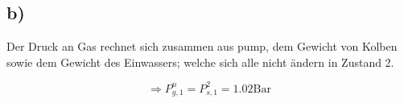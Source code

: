 

\subsection*{b)}
Der Druck an Gas rechnet sich zusammen aus pump, dem Gewicht von Kolben sowie dem Gewicht des Einwassers; welche sich alle nicht ändern in Zustand 2.

\begin{equation*}
\Rightarrow P_{g,1}^n = P_{s,1}^2 = 1.02 \text{Bar}
\end{equation*}